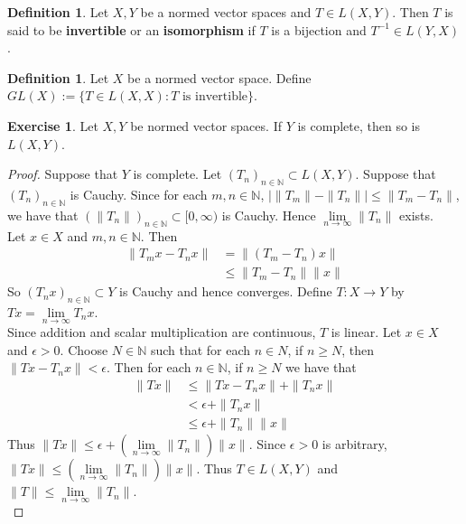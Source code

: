 \documentclass[12pt]{amsart}
\theoremstyle{definition}
\newtheorem{defn}[definition]{Definition}
\newtheorem{ex}[definition]{Exercise}
\newcommand{\ep}{\epsilon}
\newcommand{\N}{\mathbb{N}}
\newcommand{\tbf}[1]{\textbf{#1}}
\newcommand{\Rg}{[0,\infty)}
\newcommand{\limn}{\lim \limits_{n \rightarrow \infty}}
\DeclareMathOperator*{\0}{\mbf{0}}
\DeclareMathOperator*{\1}{\mbf{1}}
\newcommand{\lex}[1]{\label{ex:#1}}
\newcommand{\ld}[1]{\label{defn:#1}}
\begin{document}
	\begin{defn} \ld{42010}
		Let $X,Y$ be a normed vector spaces and $T \in L(X,Y)$. Then $T$ is said to be \tbf{invertible} or an \tbf{isomorphism} if $T$ is a bijection and $T^{-1} \in L(Y,X)$.
	\end{defn}
	
	\begin{defn} \ld{42011}
		Let $X$ be a normed vector space. Define $GL(X) := \{T \in L(X,X): T \text{ is invertible}\}$.
	\end{defn}
	
	\begin{ex} \lex{42013}
		Let $X,Y$ be normed vector spaces. If $Y$ is complete, then so is $L(X,Y)$.
	\end{ex}
	
	\begin{proof}
		Suppose that $Y$ is complete. Let $(T_n)_{n \in \N} \subset L(X,Y)$. Suppose that $(T_n)_{n \in \N}$ is Cauchy. Since for each $m,n \in \N$, $\big\vert \|T_m \|- \|T_n \|\big\vert \leq \|T_m -T_n \|$, we have that $(\|T_n \|)_{n \in \N} \subset \Rg$ is Cauchy. Hence $\lim\limits_{n \rightarrow \infty}\|T_n \|$ exists. \vspace{1cm} \\ Let $x \in X$ and $m,n \in \N$. Then 
		\begin{align*}
			\|T_m x - T_n x \|
			&= \|(T_m-T_n) x \|\\
			&\leq \|T_m-T_n \|\|x \|
		\end{align*}
		So $(T_nx)_{n \in \N} \subset Y$ is Cauchy and hence converges. Define $T:X \rightarrow Y$ by $Tx = \lim\limits_{n \rightarrow \infty} T_nx$. \vspace{1cm}\\
		Since addition and scalar multiplication are continuous, $T$ is linear. Let $x \in X$ and $\ep>0$. Choose $N \in \N$ such that for each $n \in N$, if $n \geq N$, then $\|Tx - T_n x\|< \ep$. Then for each $n \in \N$, if $n \geq N$ we have that 
		\begin{align*}
			\|Tx\|
			&\leq \|Tx-T_nx \|+ \|T_nx \|\\
			&< \ep + \|T_nx \|\\
			&\leq \ep + \|T_n \|\|x \|
		\end{align*}  
		Thus $\|Tx \|\leq \ep +(\lim\limits_{n \rightarrow \infty} \|T_n \|) \|x \|$. Since $\ep >0$ is arbitrary, $\|Tx \|\leq (\lim\limits_{n \rightarrow \infty} \|T_n \|) \|x \|$. Thus $T \in L(X,Y)$ and $\|T \|\leq \limn \|T_n \|$. \vspace{1cm} \\

\end{proof}
\end{document}
